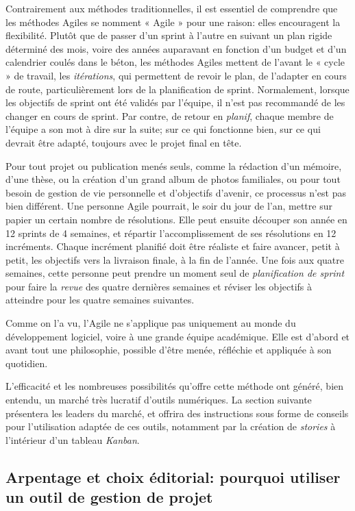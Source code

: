 \documentclass[
  letterpaper,
  DIV=11,
  numbers=noendperiod]{scrreprt}
\begin{document}
Contrairement aux méthodes traditionnelles, il est essentiel de
comprendre que les méthodes Agiles se nomment « Agile » pour une raison:
elles encouragent la flexibilité. Plutôt que de passer d'un sprint à
l'autre en suivant un plan rigide déterminé des mois, voire des années
auparavant en fonction d'un budget et d'un calendrier coulés dans le
béton, les méthodes Agiles mettent de l'avant le « cycle » de travail,
les \emph{itérations}, qui permettent de revoir le plan, de l'adapter en
cours de route, particulièrement lors de la planification de sprint.
Normalement, lorsque les objectifs de sprint ont été validés par
l'équipe, il n'est pas recommandé de les changer en cours de sprint. Par
contre, de retour en \emph{planif}, chaque membre de l'équipe a son mot
à dire sur la suite; sur ce qui fonctionne bien, sur ce qui devrait être
adapté, toujours avec le projet final en tête.

Pour tout projet ou publication menés seuls, comme la rédaction d'un
mémoire, d'une thèse, ou la création d'un grand album de photos
familiales, ou pour tout besoin de gestion de vie personnelle et
d'objectifs d'avenir, ce processus n'est pas bien différent. Une
personne Agile pourrait, le soir du jour de l'an, mettre sur papier un
certain nombre de résolutions. Elle peut ensuite découper son année en
12 sprints de 4 semaines, et répartir l'accomplissement de ses
résolutions en 12 incréments. Chaque incrément planifié doit être
réaliste et faire avancer, petit à petit, les objectifs vers la
livraison finale, à la fin de l'année. Une fois aux quatre semaines,
cette personne peut prendre un moment seul de \emph{planification de
sprint} pour faire la \emph{revue} des quatre dernières semaines et
réviser les objectifs à atteindre pour les quatre semaines suivantes.

Comme on l'a vu, l'Agile ne s'applique pas uniquement au monde du
développement logiciel, voire à une grande équipe académique. Elle est
d'abord et avant tout une philosophie, possible d'être menée, réfléchie
et appliquée à son quotidien.

L'efficacité et les nombreuses possibilités qu'offre cette méthode ont
généré, bien entendu, un marché très lucratif d'outils numériques. La
section suivante présentera les leaders du marché, et offrira des
instructions sous forme de conseils pour l'utilisation adaptée de ces
outils, notamment par la création de \emph{stories} à l'intérieur d'un
tableau \emph{Kanban}.

\hypertarget{arpentage-et-choix-uxe9ditorial-pourquoi-utiliser-un-outil-de-gestion-de-projet}{%
\subsection{Arpentage et choix éditorial: pourquoi utiliser un outil de
gestion de
projet}\label{arpentage-et-choix-uxe9ditorial-pourquoi-utiliser-un-outil-de-gestion-de-projet}}
\end{document}
